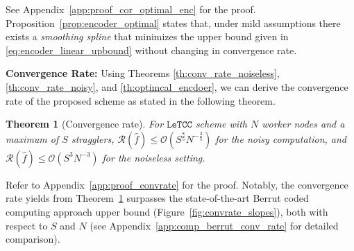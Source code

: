 \documentclass{article}
\newtheorem{theorem}{Theorem}
\def\nprcc{\texttt{LeTCC}}
\begin{document}
See Appendix~\ref{app:proof_cor_optimal_enc} for the proof. Proposition~\ref{prop:encoder_optimal} states that, under mild assumptions there exists a \emph{smoothing spline} that minimizes the upper bound given in \eqref{eq:encoder_linear_upbound} without changing in convergence rate.

{\bf Convergence Rate:} Using Theorems \ref{th:conv_rate_noiseless}, \ref{th:conv_rate_noisy}, and \ref{th:optimcal_encdoer}, we can derive the convergence rate of the proposed scheme as stated in the following theorem.
\begin{theorem}[Convergence rate]\label{th:conv_rate}
For $\nprcc$ scheme with $N$ worker nodes and a maximum of $S$ stragglers, 
$
 \mathcal{R}(\hat{f}) \leqslant \mathcal{O}
 \left(S^{\frac{8}{5}}N^{-\frac{3}{5}}
 \right)
$ for the noisy computation, and 
$
 \mathcal{R}(\hat{f}) \leqslant \mathcal{O}\left(S^{3}N^{-3}\right)
$ for the noiseless setting.
\end{theorem} 
Refer to Appendix~\ref{app:proof_convrate}
for the proof. Notably, the convergence rate yields from Theorem~\ref{th:conv_rate} surpasses the state-of-the-art Berrut coded computing approach upper bound \citep{jahani2022berrut} (Figure~\ref{fig:convrate_slopes}), both with respect to $S$ and $N$ (see Appendix~\ref{app:comp_berrut_conv_rate} for detailed comparison).

\end{document}
